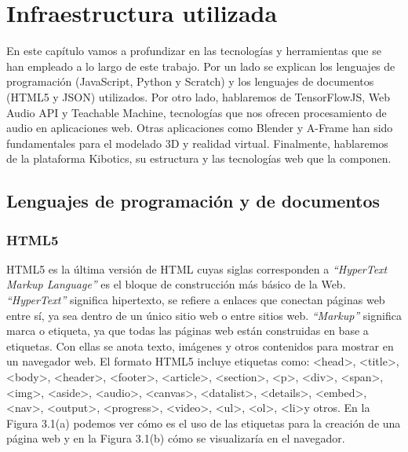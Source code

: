 \chapter{Infraestructura utilizada}
\label{infraestructura}
En este capítulo vamos a profundizar en las tecnologías y herramientas que se han empleado a lo largo de este trabajo. Por un lado se explican los lenguajes de programación (JavaScript, Python y Scratch) y los lenguajes de documentos (HTML5 y JSON) utilizados. Por otro lado, hablaremos de TensorFlowJS, Web Audio API y Teachable Machine, tecnologías que nos ofrecen procesamiento de audio en aplicaciones web. Otras aplicaciones como Blender y A-Frame han sido fundamentales para el  modelado 3D y realidad virtual. Finalmente, hablaremos de la plataforma Kibotics, su estructura y las tecnologías web que la componen.
\section{Lenguajes de programación y de documentos}
\subsection{HTML5}
HTML5 es la última versión de HTML cuyas siglas corresponden a \textit{``HyperText Markup Language''} es el bloque de construcción más básico de la Web\cite{html}. \textit{``HyperText''} significa hipertexto, se refiere a enlaces que conectan páginas web entre sí, ya sea dentro de un único sitio web o entre sitios web. 
\textit{``Markup''} significa marca o etiqueta, ya que todas las páginas web están construidas en base a etiquetas. Con ellas se anota texto, imágenes y otros contenidos para mostrar en un navegador web. El formato HTML5 incluye etiquetas como:  \textless head\textgreater, \textless title\textgreater, \textless body\textgreater, \textless header\textgreater, \textless footer\textgreater, \textless article\textgreater, \textless section\textgreater, \textless p\textgreater, \textless div\textgreater, \textless span\textgreater, \textless img\textgreater, \textless aside\textgreater, \textless audio\textgreater, \textless canvas\textgreater, \textless datalist\textgreater, \textless details\textgreater, \textless embed\textgreater, \textless nav\textgreater, \textless output\textgreater, \textless progress\textgreater, \textless video\textgreater, \textless ul\textgreater, \textless ol\textgreater, \textless li\textgreater  y otros. En la Figura 3.1(a) podemos ver cómo es el uso de las etiquetas para la creación de una página web y en la Figura 3.1(b) cómo se visualizaría en el navegador.


